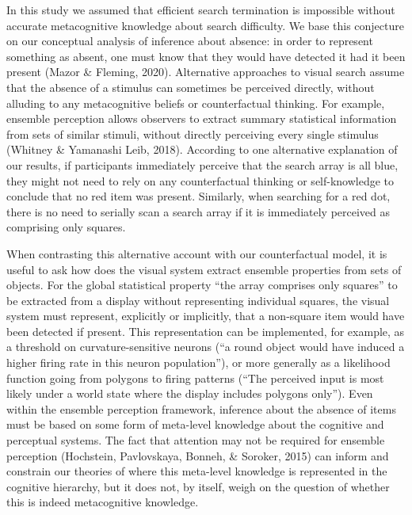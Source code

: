 \documentclass[
  english,
  man]{apa6}
\begin{document}
In this study we assumed that efficient search termination is impossible without accurate metacognitive knowledge about search difficulty. We base this conjecture on our conceptual analysis of inference about absence: in order to represent something as absent, one must know that they would have detected it had it been present (Mazor \& Fleming, 2020). Alternative approaches to visual search assume that the absence of a stimulus can sometimes be perceived directly, without alluding to any metacognitive beliefs or counterfactual thinking. For example, ensemble perception allows observers to extract summary statistical information from sets of similar stimuli, without directly perceiving every single stimulus (Whitney \& Yamanashi Leib, 2018). According to one alternative explanation of our results, if participants immediately perceive that the search array is all blue, they might not need to rely on any counterfactual thinking or self-knowledge to conclude that no red item was present. Similarly, when searching for a red dot, there is no need to serially scan a search array if it is immediately perceived as comprising only squares.

When contrasting this alternative account with our counterfactual model, it is useful to ask how does the visual system extract ensemble properties from sets of objects. For the global statistical property \enquote{the array comprises only squares} to be extracted from a display without representing individual squares, the visual system must represent, explicitly or implicitly, that a non-square item would have been detected if present. This representation can be implemented, for example, as a threshold on curvature-sensitive neurons (\enquote{a round object would have induced a higher firing rate in this neuron population}), or more generally as a likelihood function going from polygons to firing patterns (\enquote{The perceived input is most likely under a world state where the display includes polygons only}). Even within the ensemble perception framework, inference about the absence of items must be based on some form of meta-level knowledge about the cognitive and perceptual systems. The fact that attention may not be required for ensemble perception (Hochstein, Pavlovskaya, Bonneh, \& Soroker, 2015) can inform and constrain our theories of where this meta-level knowledge is represented in the cognitive hierarchy, but it does not, by itself, weigh on the question of whether this is indeed metacognitive knowledge.
\end{document}
